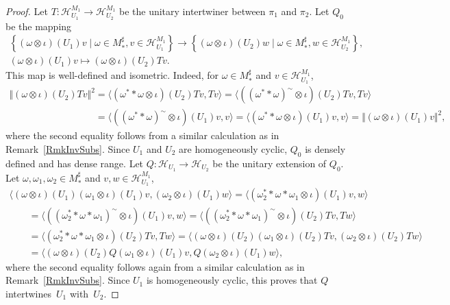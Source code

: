 \documentclass[pdftex]{sigma}
\numberwithin{equation}{section}
\theoremstyle{definition}
\newcommand{\cHil}{\mathcal{H}}
\begin{document}
\begin{proof}
Let $T: \cHil_{U_1}^{M_1} \rightarrow \cHil_{U_2}^{M_1} $ be the unitary intertwiner between $\pi_1$ and $\pi_2$. Let $Q_0$ be the mapping
\begin{gather*}
 \left\{ (\omega \otimes \iota)(U_1) v \mid \omega \in M_\ast^\sharp, v \in \cHil_{U_1}^{M_1} \right\}  \rightarrow
 \left\{ (\omega \otimes \iota)(U_2) w \mid \omega \in M_\ast^\sharp, w \in \cHil_{U_2}^{M_1} \right\}, \\
(\omega \otimes \iota)(U_1) v   \mapsto (\omega \otimes \iota)(U_2) T v.
\end{gather*}
This map is well-def\/ined and isometric. Indeed, for $\omega \in M_\ast^\sharp$ and $v \in \cHil_{U_1}^{M_1}$,
\begin{gather*}
  \Vert (\omega \otimes \iota)(U_2) T v \Vert^2 = \langle (\omega^\ast \ast \omega \otimes \iota)(U_2) T v, T v \rangle =
 \langle( (\omega^\ast \ast \omega )^\sim \otimes \iota)(U_2) T v, T v \rangle \\
 \phantom{\Vert (\omega \otimes \iota)(U_2) T v \Vert^2}{}  =
\langle( (\omega^\ast \ast \omega )^\sim\otimes \iota)(U_1)  v,  v \rangle =
 \langle (\omega^\ast \ast \omega \otimes \iota)(U_1)  v,  v \rangle =
 \Vert (\omega \otimes \iota)(U_1) v \Vert^2,
\end{gather*}
where the second equality follows from a similar calculation as in Remark~\ref{RmkInvSubs}.
Since $U_1$ and $U_2$ are homogeneously cyclic, $Q_0$ is densely def\/ined and has dense range. Let $Q: \cHil_{U_1} \rightarrow \cHil_{U_2}$ be the unitary extension of $Q_0$.  Let $\omega, \omega_1, \omega_2 \in M_\ast^\sharp$ and $v, w \in \cHil_{U_1}^{M_1}$,
\begin{gather*}
  \langle (\omega \otimes \iota)(U_1) (\omega_1 \otimes \iota)(U_1) v, (\omega_2 \otimes \iota)(U_1) w \rangle =
 \langle (\omega_2^\ast \ast \omega \ast \omega_1 \otimes \iota)(U_1)  v, w \rangle  \\
\qquad{}=  \langle ( (\omega_2^\ast \ast \omega \ast \omega_1)^\sim \otimes \iota)(U_1)  v, w \rangle =
 \langle ( (\omega_2^\ast \ast \omega \ast \omega_1)^\sim \otimes \iota)(U_2) T  v,  T w \rangle  \\
\qquad {} = \langle (\omega_2^\ast \ast \omega \ast \omega_1 \otimes \iota)(U_2) T  v,  T w \rangle =
\langle (\omega \otimes \iota)(U_2) (\omega_1 \otimes \iota)(U_2) T v, (\omega_2 \otimes \iota)(U_2) T w \rangle  \\
\qquad {}= \langle (\omega \otimes \iota)(U_2) Q (\omega_1 \otimes \iota)(U_1)  v, Q (\omega_2 \otimes \iota)(U_1)  w \rangle,
\end{gather*}
where the second equality follows again from a similar calculation as in Remark~\ref{RmkInvSubs}.
Since $U_1$ is homogeneously cyclic, this proves that $Q$ intertwines~$U_1$ with~$U_2$.
\end{proof}
\end{document}
